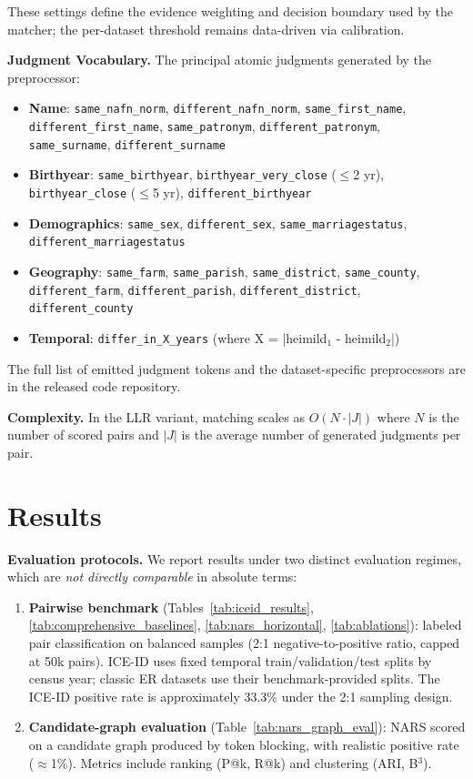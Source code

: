 \documentclass{article}
\begin{document}
These settings define the evidence weighting and decision boundary used by the matcher; the per-dataset threshold remains data-driven via calibration.

\textbf{Judgment Vocabulary.} The principal atomic judgments generated by the preprocessor:

\begin{itemize}
  \item \textbf{Name}: \texttt{same\_nafn\_norm}, \texttt{different\_nafn\_norm}, \texttt{same\_first\_name}, \texttt{different\_first\_name}, \texttt{same\_patronym}, \texttt{different\_patronym}, \texttt{same\_surname}, \texttt{different\_surname}
  \item \textbf{Birthyear}: \texttt{same\_birthyear}, \texttt{birthyear\_very\_close} ($\le$2 yr), \texttt{birthyear\_close} ($\le$5 yr), \texttt{different\_birthyear}
  \item \textbf{Demographics}: \texttt{same\_sex}, \texttt{different\_sex}, \texttt{same\_marriagestatus}, \texttt{different\_marriagestatus}
  \item \textbf{Geography}: \texttt{same\_farm}, \texttt{same\_parish}, \texttt{same\_district}, \texttt{same\_county}, \texttt{different\_farm}, \texttt{different\_parish}, \texttt{different\_district}, \texttt{different\_county}
  \item \textbf{Temporal}: \texttt{differ\_in\_X\_years} (where X = |heimild$_1$ - heimild$_2$|)
\end{itemize}

The full list of emitted judgment tokens and the dataset-specific preprocessors are in the released code repository.

\textbf{Complexity.} In the LLR variant, matching scales as $O(N \cdot |J|)$ where $N$ is the number of scored pairs and $|J|$ is the average number of generated judgments per pair.


\section{Results}

\textbf{Evaluation protocols.} We report results under two distinct evaluation regimes, which are \emph{not directly comparable} in absolute terms:
\begin{enumerate}
  \item \textbf{Pairwise benchmark} (Tables~\ref{tab:iceid_results}, \ref{tab:comprehensive_baselines}, \ref{tab:nars_horizontal}, \ref{tab:ablations}): labeled pair classification on balanced samples (2:1 negative-to-positive ratio, capped at 50k pairs). ICE-ID uses fixed temporal train/validation/test splits by census year; classic ER datasets use their benchmark-provided splits. The ICE-ID positive rate is approximately 33.3\% under the 2:1 sampling design.
  \item \textbf{Candidate-graph evaluation} (Table~\ref{tab:nars_graph_eval}): NARS scored on a candidate graph produced by token blocking, with realistic positive rate ($\approx$1\%). Metrics include ranking (P@k, R@k) and clustering (ARI, B$^3$).
\end{enumerate}
\end{document}
